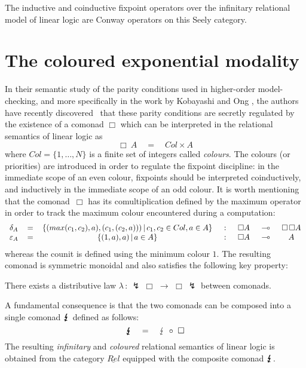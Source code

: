 \documentclass[runningheads,a4paper]{llncs}
\newcommand{\superbang}{\lightning} \newcommand{\modality}{\Box}
\newcommand{\colorbang}{\lightning\hspace{-.5765em}\lightning\hspace{-.5765em}\lightning}
\newcommand{\Relinfinitary}{\underline{Rel}}
\begin{document}
\begin{property}
The inductive and coinductive fixpoint operators over the infinitary relational model of linear logic are Conway operators on this Seely category.
\end{property}

\section{The coloured exponential modality}\label{section/coloured-modality}
In their semantic study of the parity conditions used in higher-order model-checking,
and more specifically in the work by Kobayashi and Ong \cite{kobayashi-ong},
the authors have recently discovered~\cite{coloured-tensorial-logic} that these parity conditions are secretly regulated
by the existence of a comonad $\modality$ which can be interpreted in the relational semantics of linear logic
as 
$$
\modality\ A \quad = \quad Col \times A
$$
where $Col=\{1,\dots,N\}$ is a finite set of integers called \emph{colours}.
The colours (or priorities) are introduced in order to regulate the fixpoint discipline:
in the immediate scope of an even colour, fixpoints should be interpreted coinductively,
and inductively in the immediate scope of an odd colour.
It is worth mentioning that the comonad~$\modality$ has its comultiplication defined by the maximum operator
in order to track the maximum colour encountered during a computation:
$$
\begin{array}{ccccccc}
\delta_A &\, = \, &\{ (max(c_1,c_2), a) , (c_1, (c_2, a))) \, | \, c_1,c_2\in Col, a\in A\} &\hspace{.5em} : \hspace{.5em}&
\modality A & \hspace{.5em} \multimap  \hspace{.5em} & \modality \, \modality A\\
\varepsilon_A & =  & \{ (1,a) , a) \, | \, a\in A\} &  :  & \modality A &  \multimap  & A
\end{array}
$$
whereas the counit is defined using the minimum colour $1$.
The resulting comonad is symmetric monoidal and also satisfies the following key property:

\begin{property}
There exists a distributive law $\lambda \, : \,  \superbang \ \modality \,\, \rightarrow \,\, \modality \ \superbang$ between comonads.
\end{property}

\noindent
A fundamental consequence is that the two comonads can be composed 
into a single comonad $\colorbang$ defined as follows:
$$
\colorbang \quad  = \quad  \superbang \ \circ \ \modality
$$
The resulting \emph{infinitary} and \emph{coloured} relational semantics of linear logic
is obtained from the category $\Relinfinitary$ equipped with the composite comonad $\colorbang$.
\end{document}
